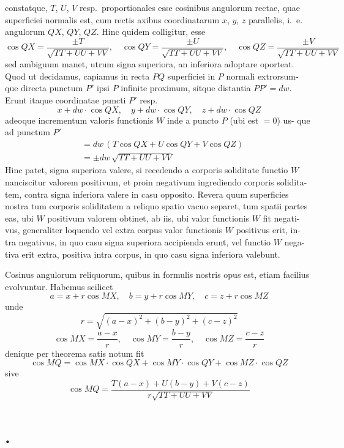 \documentclass[12pt,a4paper]{article}
\theoremstyle{gauss}
\begin{document}
constatque, $T$, $U$, $V$ resp.~proportionales esse cosinibus angulorum rectae, quae
superficiei normalis est, cum rectis axibus coordinatarum $x$, $y$, $z$ parallelis, i.~e.
angulorum $QX$, $QY$, $QZ$. Hinc quidem colligitur, esse
\[
\cos QX = \frac{\pm T}{\sqrt{TT+UU+VV}},\quad
\cos QY = \frac{\pm U}{\sqrt{TT+UU+VV}},\quad
\cos QZ = \frac{\pm V}{\sqrt{TT+UU+VV}}
\]
sed ambiguum manet, utrum signa superiora, an inferiora adoptare oporteat.
Quod ut decidamus, capiamus in recta $PQ$ superficiei in $P$ normali extrorsum-
que directa punctum $P'$ ipsi $P$ infinite proximum, sitque distantia $PP'=dw$.
Erunt itaque coordinatae puncti $P'$ resp.
\[
x + dw\cdot\cos QX,\quad y + dw\cdot\cos QY,\quad z + dw\cdot\cos QZ
\]
adeoque incrementum valoris functionis $W$ inde a puncto $P$ (ubi est $=0$) us-
que ad punctum $P'$
\begin{align*}
&= dw\,(T\cos QX + U\cos QY + V\cos QZ)\\
&= \pm dw\,\sqrt{TT+UU+VV}
\end{align*}
Hinc patet, signa superiora valere, si recedendo a corporis soliditate functio $W$
nanciscitur valorem positivum, et proin negativum ingrediendo corporis solidita-
tem, contra signa inferiora valere in casu opposito. Revera quum superficies
nostra tum corporis soliditatem a reliquo spatio vacuo separet, tum spatii partes
eas, ubi $W$ positivum valorem obtinet, ab iis, ubi valor functionis $W$ fit negati-
vus, generaliter loquendo vel extra corpus valor functionis $W$ positivus erit, in-
tra negativus, in quo casu signa superiora accipienda erunt, vel functio $W$ nega-
tiva erit extra, positiva intra corpus, in quo casu signa inferiora valebunt.

Cosinus angulorum reliquorum, quibus in formulis nostris opus est, etiam
facilius evolvuntur. Habemus scilicet
\[
a = x + r\cos MX,\quad b = y + r\cos MY,\quad c = z + r\cos MZ
\]
unde
\[
r = \sqrt{(a-x)^2 + (b-y)^2 + (c-z)^2}
\]
\[
\cos MX = \frac{a-x}{r},\quad \cos MY = \frac{b-y}{r},\quad \cos MZ = \frac{c-z}{r}
\]
denique per theorema satis notum fit
\[
\cos MQ = \cos MX\cdot\cos QX + \cos MY\cdot\cos QY + \cos MZ\cdot\cos QZ
\]
sive
\[
\cos MQ = \frac{T(a-x) + U(b-y) + V(c-z)}{r\sqrt{TT+UU+VV}}
\]

\newpage
\setcounter{page}{21}

\section*{%
%
\thesection.}
\end{document}
